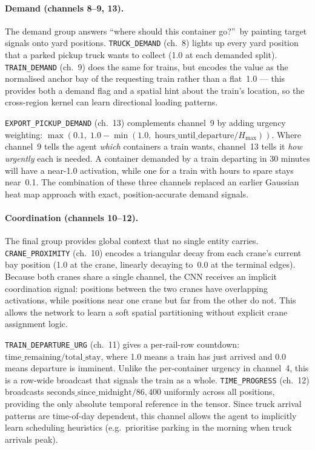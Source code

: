 \paragraph{Demand (channels 8--9, 13).}
\label{sec:state:channels:demand}
The demand group answers ``where should this container go?''\ by painting target signals onto yard positions. \texttt{TRUCK\_DEMAND} (ch.~8) lights up every yard position that a parked pickup truck wants to collect (1.0 at each demanded split). \texttt{TRAIN\_DEMAND} (ch.~9) does the same for trains, but encodes the value as the normalised anchor bay of the requesting train rather than a flat~1.0 --- this provides both a demand flag and a spatial hint about the train's location, so the cross-region kernel can learn directional loading patterns.

\texttt{EXPORT\_PICKUP\_DEMAND} (ch.~13) complements channel~9 by adding urgency weighting: $\max(0.1,\; 1.0 - \min(1.0,\; \text{hours\_until\_departure} / H_\text{max}))$. Where channel~9 tells the agent \emph{which} containers a train wants, channel~13 tells it \emph{how urgently} each is needed. A container demanded by a train departing in 30 minutes will have a near-1.0 activation, while one for a train with hours to spare stays near~0.1. The combination of these three channels replaced an earlier Gaussian heat map approach with exact, position-accurate demand signals.

\paragraph{Coordination (channels 10--12).}
\label{sec:state:channels:coord}
The final group provides global context that no single entity carries. \texttt{CRANE\_PROXIMITY} (ch.~10) encodes a triangular decay from each crane's current bay position (1.0 at the crane, linearly decaying to~0.0 at the terminal edges). Because both cranes share a single channel, the CNN receives an implicit coordination signal: positions between the two cranes have overlapping activations, while positions near one crane but far from the other do not. This allows the network to learn a soft spatial partitioning without explicit crane assignment logic.

\texttt{TRAIN\_DEPARTURE\_URG} (ch.~11) gives a per-rail-row countdown: $\text{time\_remaining} / \text{total\_stay}$, where 1.0 means a train has just arrived and 0.0 means departure is imminent. Unlike the per-container urgency in channel~4, this is a row-wide broadcast that signals the train as a whole. \texttt{TIME\_PROGRESS} (ch.~12) broadcasts $\text{seconds\_since\_midnight} / 86{,}400$ uniformly across all positions, providing the only absolute temporal reference in the tensor. Since truck arrival patterns are time-of-day dependent, this channel allows the agent to implicitly learn scheduling heuristics (e.g.\ prioritise parking in the morning when truck arrivals peak).

